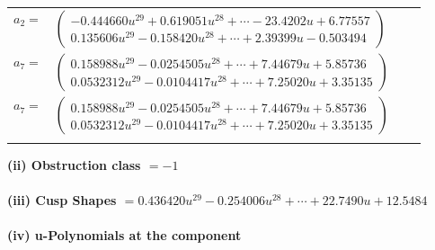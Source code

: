\documentclass[1p]{elsarticle_modified}
\theoremstyle{definition}
\begin{document}
\begin{tabular}{m{7pt} m{180pt} m{7pt} m{180pt} }
\flushright $a_{2}=$&$\begin{pmatrix}-0.444660 u^{29}+0.619051 u^{28}+\cdots-23.4202 u+6.77557\\0.135606 u^{29}-0.158420 u^{28}+\cdots+2.39399 u-0.503494\end{pmatrix}$ \\
\flushright $a_{7}=$&$\begin{pmatrix}0.158988 u^{29}-0.0254505 u^{28}+\cdots+7.44679 u+5.85736\\0.0532312 u^{29}-0.0104417 u^{28}+\cdots+7.25020 u+3.35135\end{pmatrix}$\\ \flushright $a_{7}=$&$\begin{pmatrix}0.158988 u^{29}-0.0254505 u^{28}+\cdots+7.44679 u+5.85736\\0.0532312 u^{29}-0.0104417 u^{28}+\cdots+7.25020 u+3.35135\end{pmatrix}$\\&\end{tabular}
\flushleft \textbf{(ii) Obstruction class $= -1$}\\~\\
\flushleft \textbf{(iii) Cusp Shapes $= 0.436420 u^{29}-0.254006 u^{28}+\cdots+22.7490 u+12.5484$}\\~\\
\newpage\renewcommand{\arraystretch}{1}
\flushleft \textbf{(iv) u-Polynomials at the component}\newline \\
\end{document}
